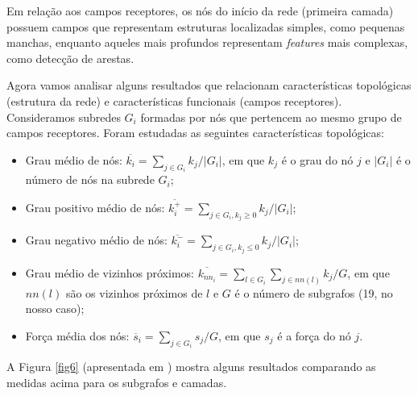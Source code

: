 \documentclass{article}
\begin{document}
            Em relação aos campos receptores, os nós do início da rede (primeira camada) possuem campos que representam estruturas localizadas simples, como pequenas manchas,
            enquanto aqueles mais profundos representam \textit{features} mais complexas, como detecção de arestas.

            Agora vamos analisar alguns resultados que relacionam características topológicas (estrutura da rede) e características funcionais (campos receptores).
            Consideramos subredes $G_i$ formadas por nós que pertencem ao mesmo grupo de campos receptores.
            Foram estudadas as seguintes características topológicas:

            \begin{itemize}
                \item Grau médio de nós: $\overline{k_i} = \sum_{j \in G_i} k_j / |G_i|$, em que $k_j$ é o grau do nó $j$ e $|G_i|$ é o número de nós na subrede $G_i$;
                \item Grau positivo médio de nós: $\overline{k_i^+} = \sum_{j \in G_i, k_j \ge 0} k_j / |G_i|$;
                \item Grau negativo médio de nós: $\overline{k_i^-} = \sum_{j \in G_i, k_j \le 0} k_j / |G_i|$;
                \item Grau médio de vizinhos próximos: $\overline{k_{nn_i}} = \sum_{l \in G_i} \sum_{j \in nn(l)} k_j / G$, em que $nn(l)$ são os vizinhos próximos de $l$ e $G$ é o número de subgrafos (19, no nosso caso);
                \item Força média dos nós: $\overline{s}_i = \sum_{j \in G_i} s_j / G$, em que $s_j$ é a força do nó $j$.
            \end{itemize}

            A Figura \ref{fig6} (apresentada em \cite{testolin2018deep}) mostra alguns resultados comparando as medidas acima para os subgrafos e camadas.
\end{document}
